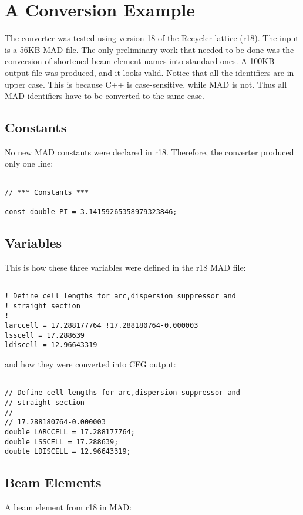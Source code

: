 \documentclass[12pt]{article}
\begin{document}
\section{A Conversion Example}
The converter was tested using version 18 of the Recycler lattice (r18). The
input is a 56KB MAD file. The only preliminary work that needed to be done was
the conversion of shortened beam element names into standard ones. A 100KB
output file was produced, and it looks valid. Notice that all the identifiers
are in upper case. This is because C++ is case-sensitive, while MAD is not.
Thus all MAD identifiers have to be converted to the same case.

\subsection{Constants}
No new MAD constants were declared in r18. Therefore, the converter produced
only one line:

\begin{verbatim}

// *** Constants ***

const double PI = 3.14159265358979323846;

\end{verbatim}

\subsection{Variables}
This is how these three variables were defined in the r18 MAD file:

\begin{verbatim}

! Define cell lengths for arc,dispersion suppressor and
! straight section
!
larccell = 17.288177764 !17.288180764-0.000003
lsscell = 17.288639
ldiscell = 12.96643319

\end{verbatim}

\noindent and how they were converted into CFG output:

\begin{verbatim}

// Define cell lengths for arc,dispersion suppressor and
// straight section
//
// 17.288180764-0.000003
double LARCCELL = 17.288177764;
double LSSCELL = 17.288639;
double LDISCELL = 12.96643319;

\end{verbatim}

\subsection{Beam Elements}
A beam element from r18 in MAD:
\end{document}
